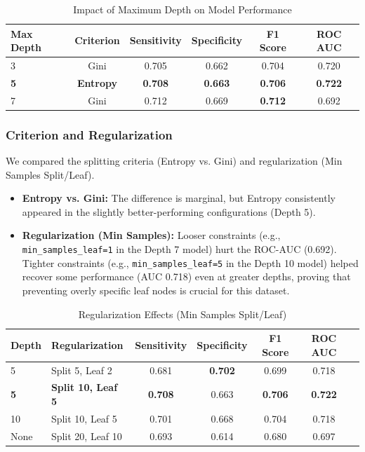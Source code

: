 \documentclass[12pt,a4paper]{article}
\begin{document}
\begin{table}[h!]
\centering
\begin{tabular}{lccccc}
\toprule
\textbf{Max Depth} & \textbf{Criterion} & \textbf{Sensitivity} & \textbf{Specificity} & \textbf{F1 Score} & \textbf{ROC AUC} \\
\midrule
3 & Gini & 0.705 & 0.662 & 0.704 & 0.720 \\
\textbf{5} & \textbf{Entropy} & \textbf{0.708} & \textbf{0.663} & \textbf{0.706} & \textbf{0.722} \\
7 & Gini & 0.712 & 0.669 & \textbf{0.712} & 0.692 \\
\bottomrule
\end{tabular}
\caption{Impact of Maximum Depth on Model Performance}
\end{table}

\subsubsection*{Criterion and Regularization}
We compared the splitting criteria (Entropy vs. Gini) and regularization (Min Samples Split/Leaf).

\begin{itemize}
    \item \textbf{Entropy vs. Gini:} The difference is marginal, but Entropy consistently appeared in the slightly better-performing configurations (Depth 5).
    \item \textbf{Regularization (Min Samples):} Looser constraints (e.g., \texttt{min\_samples\_leaf=1} in the Depth 7 model) hurt the ROC-AUC (0.692). Tighter constraints (e.g., \texttt{min\_samples\_leaf=5} in the Depth 10 model) helped recover some performance (AUC 0.718) even at greater depths, proving that preventing overly specific leaf nodes is crucial for this dataset.
\end{itemize}

\begin{table}[h!]
\centering
\begin{tabular}{llccccc}
\toprule
\textbf{Depth} & \textbf{Regularization} & \textbf{Sensitivity} & \textbf{Specificity} & \textbf{F1 Score} & \textbf{ROC AUC} \\
\midrule
5 & Split 5, Leaf 2 & 0.681 & \textbf{0.702} & 0.699 & 0.718 \\
\rowcolor{gray!10} \textbf{5} & \textbf{Split 10, Leaf 5} & \textbf{0.708} & 0.663 & \textbf{0.706} & \textbf{0.722} \\
10 & Split 10, Leaf 5 & 0.701 & 0.668 & 0.704 & 0.718 \\
None & Split 20, Leaf 10 & 0.693 & 0.614 & 0.680 & 0.697 \\
\bottomrule
\end{tabular}
\caption{Regularization Effects (Min Samples Split/Leaf)}
\end{table}
\end{document}

